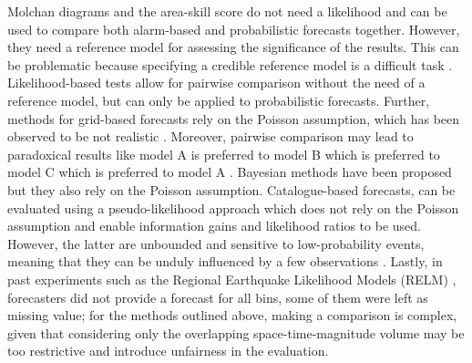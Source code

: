 \documentclass[referee,sn-basic]{sn-jnl}
\theoremstyle{thmstyleone}%
\theoremstyle{thmstyletwo}%
\theoremstyle{thmstylethree}%
\begin{document}
Molchan diagrams \citep{zechar2008testing} and the area-skill score \citep{zechar2010area} do not need a likelihood and can be used to compare both alarm-based and probabilistic forecasts together. However, they need a reference model for assessing the significance of the results. This can be problematic because specifying a credible reference model is a difficult task \citep{stark1997earthquake,luen2008testing,marzocchi2011earthquake}. Likelihood-based tests  \citep{sch,zechar,rhoades2011efficient,schneider2014likelihood} allow for pairwise comparison without the need of a reference model, but can only be applied to probabilistic forecasts. Further, methods for grid-based forecasts rely on the Poisson assumption, which has been observed to be not realistic \citep{werner2008magnitude}. Moreover, pairwise comparison may lead to paradoxical results like model A is preferred to model B which is preferred to model C which is preferred to model A \citep{zechar2013regional}. Bayesian methods have been proposed \citep{marzocchi2012bayesian} but they also rely on the Poisson assumption. Catalogue-based forecasts, can be evaluated using a pseudo-likelihood approach \citep{savran2020pseudoprospective} which does not rely on the Poisson assumption and enable information gains and likelihood ratios to be used. However, the latter are unbounded and sensitive to low-probability events, meaning that they can be unduly influenced by a few observations \citep{holliday2005earthquake,zechar2014}. Lastly, in past experiments such as the Regional Earthquake Likelihood Models (RELM) \citep{field2007overview}, forecasters did not provide a forecast for all bins, some of them were left as missing value; for the methods outlined above, making a comparison is complex, given that considering only the overlapping space-time-magnitude volume may be too restrictive and introduce unfairness in the evaluation.
\end{document}
